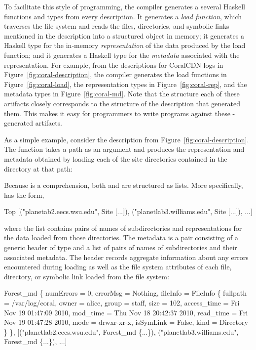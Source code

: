 \documentclass[nocopyrightspace,natbib]{sigplanconf}
\begin{document}
To facilitate this style of programming, the \forest{} compiler
generates a several Haskell functions and types from every \forest{}
description.  It generates a \emph{load function}, which traverses the
file system and reads the files, directories, and symbolic links
mentioned in the description into a structured object in memory; it
generates a Haskell type for the in-memory \emph{representation} of
the data produced by the load function; and it generates a Haskell
type for the \emph{metadata} associated with the representation. For
example, from the descriptions for CoralCDN logs in
Figure~\ref{fig:coral-description}, the compiler generates the load
functions in Figure~\ref{fig:coral-load}, the representation types in
Figure~\ref{fig:coral-rep}, and the metadata types in
Figure~\ref{fig:coral-md}. Note that the structure each of these
artifacts closely corresponds to the structure of the \forest{}
description that generated them. This makes it easy for programmers to
write programs against these \forest{}-generated artifacts.

As a simple example, consider the  description from
Figure~\ref{fig:coral-description}. The  function takes
a path as an argument and produces the representation and metadata
obtained by loading each of the site directories contained in the
directory at that path:
%
Because  is a comprehension, both  and  are
structured as lists. More specifically,  has the form,
\begin{code}
Top [("planetab2.eecs.wsu.edu", Site [...]),
     ("planetlab3.williams.edu", Site [...]), ...]
\end{code}
where the list contains pairs of names of subdirectories and
representations for the data loaded from those directories. The
metadata is a pair consisting of a generic header of type
 and a list of pairs of names of subdirectories and
their associated metadata. The header records aggregate information
about any errors encountered during loading as well as the file system
attributes of each file, directory, or symbolic link loaded from the
file system:
%
\begin{code}
Forest_md 
  \{ numErrors = 0, 
    errorMsg = Nothing, 
    fileInfo = FileInfo
      \{ fullpath = /var/log/coral, 
        owner = alice, group = staff, size = 102, 
        access_time = Fri Nov 19 01:47:09 2010, 
        mod_time = Thu Nov 18 20:42:37 2010, 
        read_time = Fri Nov 19 01:47:28 2010, 
        mode = drwxr-xr-x, isSymLink = False, 
        kind = Directory \} \},
[("planetlab2.eecs.wsu.edu", Forest_md \{...\}),
 ("planetlab3.williams.edu", Forest_md \{...\}), ...]
\end{code}
%
\end{document}
